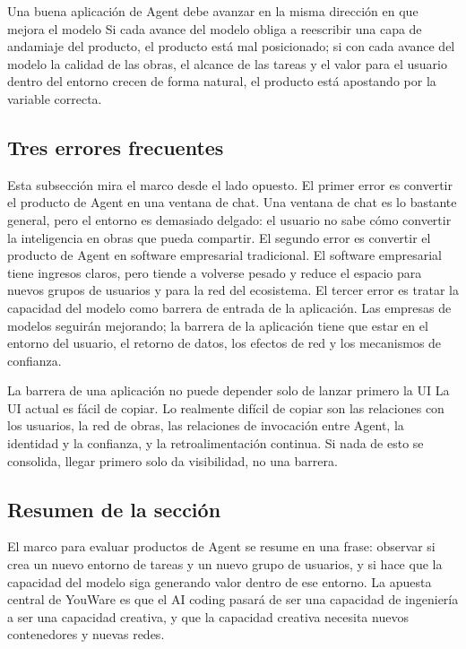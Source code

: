 \begin{importantbox}{Una buena aplicación de Agent debe avanzar en la misma dirección en que mejora el modelo}
Si cada avance del modelo obliga a reescribir una capa de andamiaje del producto, el producto está mal posicionado; si con cada avance del modelo la calidad de las obras, el alcance de las tareas y el valor para el usuario dentro del entorno crecen de forma natural, el producto está apostando por la variable correcta.
\end{importantbox}

\subsection{Tres errores frecuentes}

Esta subsección mira el marco desde el lado opuesto. El primer error es convertir el producto de Agent en una ventana de chat. Una ventana de chat es lo bastante general, pero el entorno es demasiado delgado: el usuario no sabe cómo convertir la inteligencia en obras que pueda compartir. El segundo error es convertir el producto de Agent en software empresarial tradicional. El software empresarial tiene ingresos claros, pero tiende a volverse pesado y reduce el espacio para nuevos grupos de usuarios y para la red del ecosistema. El tercer error es tratar la capacidad del modelo como barrera de entrada de la aplicación. Las empresas de modelos seguirán mejorando; la barrera de la aplicación tiene que estar en el entorno del usuario, el retorno de datos, los efectos de red y los mecanismos de confianza.

\begin{warningbox}{La barrera de una aplicación no puede depender solo de lanzar primero la UI}
La UI actual es fácil de copiar. Lo realmente difícil de copiar son las relaciones con los usuarios, la red de obras, las relaciones de invocación entre Agent, la identidad y la confianza, y la retroalimentación continua. Si nada de esto se consolida, llegar primero solo da visibilidad, no una barrera.
\end{warningbox}

\subsection{Resumen de la sección}

El marco para evaluar productos de Agent se resume en una frase: observar si crea un nuevo entorno de tareas y un nuevo grupo de usuarios, y si hace que la capacidad del modelo siga generando valor dentro de ese entorno. La apuesta central de YouWare es que el AI coding pasará de ser una capacidad de ingeniería a ser una capacidad creativa, y que la capacidad creativa necesita nuevos contenedores y nuevas redes.
